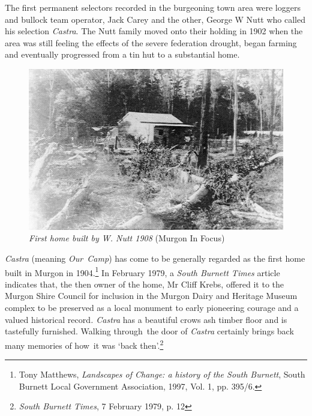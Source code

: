The first permanent selectors recorded in the burgeoning town area were loggers and bullock team operator, Jack Carey and the other, George W Nutt who called his selection \emph{Castra}. The Nutt family moved onto their holding in 1902 when the area was still feeling the effects of the severe federation drought, began farming and eventually progressed from a tin hut to a substantial home.









\begin{figure}
\begin{center}
\includegraphics[width=1.\linewidth,center]{../images/HouseWNutt1908.jpg}
\caption{{\itshape First home built by W. Nutt 1908} {\scriptsize(Murgon In Focus)}}
\end{center}
\end{figure}




\emph{Castra} (meaning \emph{Our~Camp}) has come to be generally regarded as the first home built in Murgon in 1904.\footnote{Tony Matthews, \emph{Landscapes of Change: a history of the South Burnett}, South Burnett Local Government Association, 1997, Vol. 1, pp. 395/6.} In February 1979, a \emph{South Burnett Times} article indicates that, the then owner of the home, Mr Cliff Krebs, offered it to the Murgon Shire Council for inclusion in the Murgon Dairy and Heritage Museum complex to be preserved as a local monument to early pioneering courage and a valued historical record\emph{. Castra} has a beautiful crows ash timber floor and is tastefully furnished. Walking through~the door of \emph{Castra} certainly brings back many memories of how~it was `back then'.\footnote{\emph{South Burnett Times}, 7 February 1979, p. 12}








